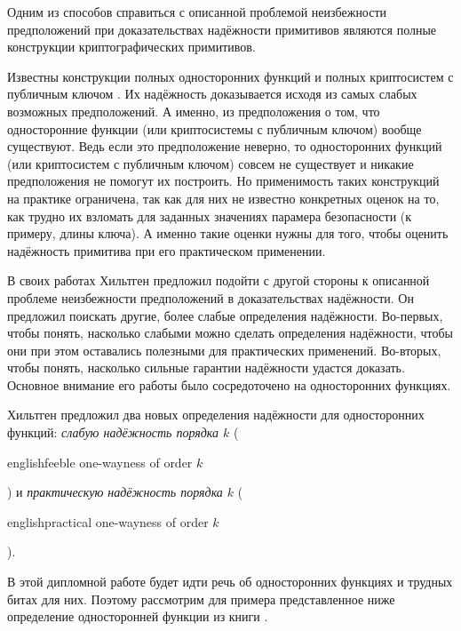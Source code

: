\documentclass[oneside, a4paper]{article}
\theoremstyle{definition}
\theoremstyle{remark}
\begin{document}
Одним из способов справиться с описанной проблемой неизбежности предположений
при доказательствах надёжности примитивов являются полные конструкции
криптографических примитивов.

Известны конструкции полных односторонних функций \cite{complete_owf,
complete_owf2} и полных криптосистем с публичным ключом \cite{complete_pkcs,
complete_pkcs2}. Их надёжность доказывается исходя из самых слабых возможных
предположений. А именно, из предположения о том, что односторонние функции (или
криптосистемы с публичным ключом) вообще существуют. Ведь если это предположение
неверно, то односторонних функций (или криптосистем с публичным ключом) совсем
не существует и никакие предположения не помогут их построить. Но применимость
таких конструкций на практике ограничена, так как для них не известно
конкретных оценок на то, как трудно их взломать для заданных значениях парамера
безопасности (к примеру, длины ключа). А именно такие оценки нужны для того,
чтобы оценить надёжность примитива при его практическом применении.

В своих работах \cite{hiltgen1993,hiltgen1994} Хильтген предложил подойти с
другой стороны к описанной проблеме неизбежности предположений в доказательствах
надёжности. Он предложил поискать другие, более слабые определения надёжности.
Во-первых, чтобы понять, насколько слабыми можно сделать определения надёжности,
чтобы они при этом оставались полезными для практических применений. Во-вторых,
чтобы понять, насколько сильные гарантии надёжности удастся доказать. Основное
внимание его работы было сосредоточено на односторонних функциях.

Хильтген предложил два новых определения надёжности для односторонних функций:
\emph{слабую надёжность порядка $k$} (\begin{foreignlanguage}{english}feeble
one-wayness of order $k$\end{foreignlanguage}) и \emph{практическую надёжность
порядка $k$} (\begin{foreignlanguage}{english}practical one-wayness of order
$k$\end{foreignlanguage}).

В этой дипломной работе будет идти речь об односторонних функциях и трудных
битах для них. Поэтому рассмотрим для примера представленное ниже определение
односторонней функции из книги \cite[гл. 2]{goldreich}.
\end{document}

